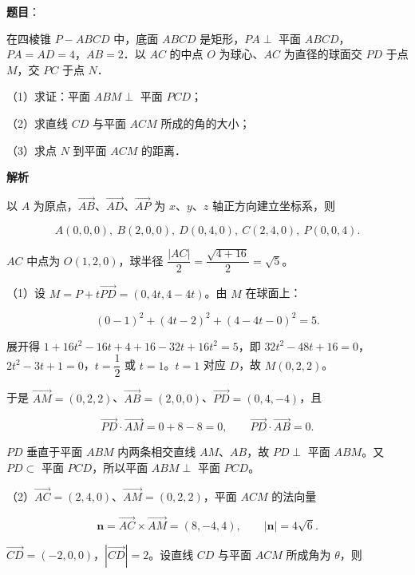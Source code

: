 \begin{answer}

\textbf{题目}：

在四棱锥 $P-ABCD$ 中，底面 $ABCD$ 是矩形，$PA\perp$ 平面 $ABCD$，$PA=AD=4$，$AB=2$．以 $AC$ 的中点 $O$ 为球心、$AC$ 为直径的球面交 $PD$ 于点 $M$，交 $PC$ 于点 $N$．

（1）求证：平面 $ABM\perp$ 平面 $PCD$；

（2）求直线 $CD$ 与平面 $ACM$ 所成的角的大小；

（3）求点 $N$ 到平面 $ACM$ 的距离．
\nopagebreak[4]
\begin{center}\end{center}
\nopagebreak[4]
\textbf{解析}

以 $A$ 为原点，$\overrightarrow{AB}$、$\overrightarrow{AD}$、$\overrightarrow{AP}$ 为 $x$、$y$、$z$ 轴正方向建立坐标系，则

\nopagebreak[4]
\[A(0,0,0),\ B(2,0,0),\ D(0,4,0),\ C(2,4,0),\ P(0,0,4).\]

$AC$ 中点为 $O(1,2,0)$，球半径 $\dfrac{|AC|}{2}=\dfrac{\sqrt{4+16}}{2}=\sqrt5$。

（1）设 $M=P+t\overrightarrow{PD}=(0,4t,4-4t)$。由 $M$ 在球面上：

\nopagebreak[4]
\[(0-1)^2+(4t-2)^2+(4-4t-0)^2=5.\]

展开得 $1+16t^2-16t+4+16-32t+16t^2=5$，即 $32t^2-48t+16=0$，$2t^2-3t+1=0$，$t=\dfrac12$ 或 $t=1$。$t=1$ 对应 $D$，故 $M(0,2,2)$。

于是 $\overrightarrow{AM}=(0,2,2)$、$\overrightarrow{AB}=(2,0,0)$、$\overrightarrow{PD}=(0,4,-4)$，且

\nopagebreak[4]
\[\overrightarrow{PD}\cdot\overrightarrow{AM}=0+8-8=0,\qquad \overrightarrow{PD}\cdot\overrightarrow{AB}=0.\]

$PD$ 垂直于平面 $ABM$ 内两条相交直线 $AM$、$AB$，故 $PD\perp$ 平面 $ABM$。又 $PD\subset$ 平面 $PCD$，所以平面 $ABM\perp$ 平面 $PCD$。

（2）$\overrightarrow{AC}=(2,4,0)$、$\overrightarrow{AM}=(0,2,2)$，平面 $ACM$ 的法向量

\nopagebreak[4]
\[\boldsymbol n=\overrightarrow{AC}\times\overrightarrow{AM}=(8,-4,4),\qquad |\boldsymbol n|=4\sqrt6.\]

$\overrightarrow{CD}=(-2,0,0)$，$|\overrightarrow{CD}|=2$。设直线 $CD$ 与平面 $ACM$ 所成角为 $\theta$，则


\end{answer}
